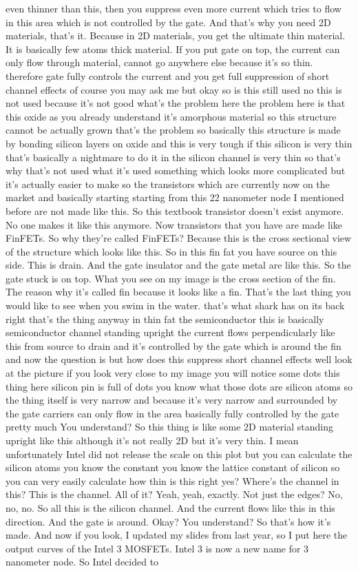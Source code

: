 even thinner than this, then you suppress even more current which tries to flow in this area which is not controlled by the gate. And that's why you need 2D materials, that's it. Because in 2D materials, you get the ultimate thin material. It is basically few atoms thick material. If you put gate on top, the current can only flow through material, cannot go anywhere else because it's so thin. therefore gate fully controls the current and you get full suppression of short channel effects of course you may ask me but okay so is this still used no this is not used because it's not good what's the problem here the problem here is that this oxide as you already understand it's amorphous material so this structure cannot be actually grown that's the problem so basically this structure is made by bonding silicon layers on oxide and this is very tough if this silicon is very thin that's basically a nightmare to do it in the silicon channel is very thin so that's why that's not used what it's used something which looks more complicated but it's actually easier to make so the transistors which are currently now on the market and basically starting starting from this 22 nanometer node I mentioned before are not made like this. So this textbook transistor doesn't exist anymore. No one makes it like this anymore. Now transistors that you have are made like FinFETs. So why they're called FinFETs? Because this is the cross sectional view of the structure which looks like this. So in this fin fat you have source on this side. This is drain. And the gate insulator and the gate metal are like this. So the gate stuck is on top. What you see on my image is the cross section of the fin. The reason why it's called fin because it looks like a fin. That's the last thing you would like to see when you swim in the water. that's what shark has on its back right that's the thing anyway in thin fat the semiconductor this is basically semiconductor channel standing upright the current flows perpendicularly like this from source to drain and it's controlled by the gate which is around the fin and now the question is but how does this suppress short channel effects well look at the picture if you look very close to my image you will notice some dots this thing here silicon pin is full of dots you know what those dots are silicon atoms so the thing itself is very narrow and because it's very narrow and surrounded by the gate carriers can only flow in the area basically fully controlled by the gate pretty much You understand? So this thing is like some 2D material standing upright like this although it's not really 2D but it's very thin. I mean unfortunately Intel did not release the scale on this plot but you can calculate the silicon atoms you know the constant you know the lattice constant of silicon so you can very easily calculate how thin is this right yes? Where's the channel in this? This is the channel. All of it? Yeah, yeah, exactly. Not just the edges? No, no, no. So all this is the silicon channel. And the current flows like this in this direction. And the gate is around. Okay? You understand? So that's how it's made. And now if you look, I updated my slides from last year, so I put here the output curves of the Intel 3 MOSFETs. Intel 3 is now a new name for 3 nanometer node. So Intel decided to 